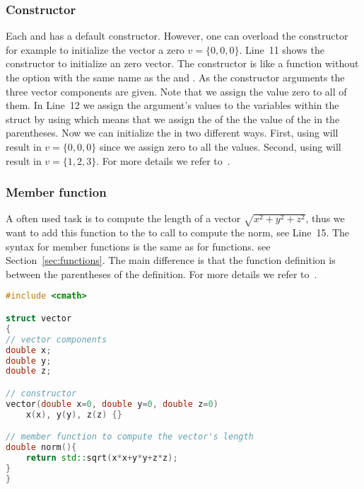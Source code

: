 \subsubsection{Constructor}
Each  and  has a default constructor. However, one can overload the constructor for example to initialize the vector a zero $v=\{0,0,0\}$. Line~11 shows the constructor to initialize an zero vector. The constructor is like a function without the  option with the same name as the  and . As the constructor arguments the three vector components are given. Note that we assign the value zero to all of them. In Line~12 we assign the argument's values to the variables within the struct by using  which means that we assign the  of the  the value of the  in the parentheses. Now we can initialize the  in two different ways. First, using  will result in $v=\{0,0,0\}$ since we assign zero to all the values. Second, using  will result in $v=\{1,2,3\}$. For more details we refer to~\cite[Chapter~4]{andrew2000accelerated}.

\subsubsection{Member function}
A often used task is to compute the length of a vector $\sqrt{x^2+y^2+z^2}$, thus we want to add this function to the  to call  to compute the norm, see Line~15. The syntax for member functions is the same as for functions. see Section~\ref{sec:functions}. The main difference is that the function definition is between the parentheses of the  definition. For more details we refer to~\cite[Chapter~4]{andrew2000accelerated}.

\begin{lstlisting}[language=c++,caption={Example for a structure for a three dimensional vector.\label{code:struct}},float,floatplacement=tb]
#include <cmath>

struct vector 
{
// vector components
double x;
double y;
double z;

// constructor
vector(double x=0, double y=0, double z=0)
	x(x), y(y), z(z) {}

// member function to compute the vector's length
double norm(){
	return std::sqrt(x*x+y*y+z*z);
}
}
\end{lstlisting}

